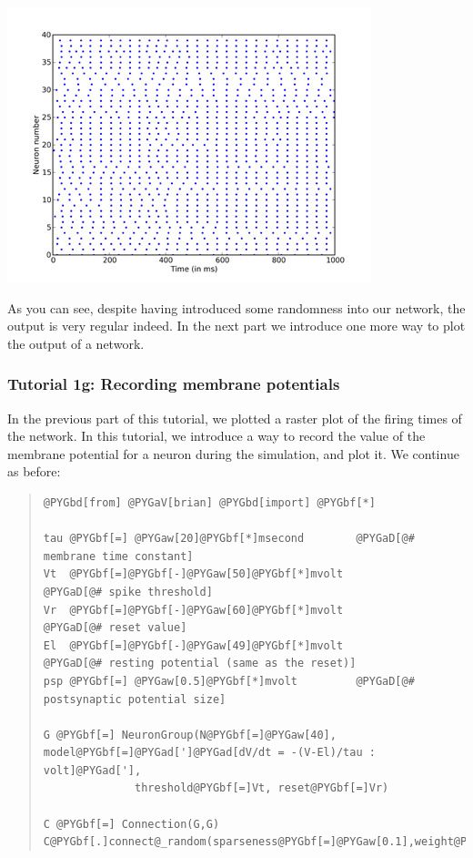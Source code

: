 \documentclass[letterpaper,10pt,english]{manual}
\begin{document}
\includegraphics{1f.jpg}

As you can see, despite having introduced some randomness into
our network, the output is very regular indeed. In the next part
we introduce one more way to plot the output of a network.

\resetcurrentobjects
\hypertarget{--doc-tutorial_1g_recording_membrane_potentials}{}

\subsubsection{Tutorial 1g: Recording membrane potentials}

In the previous part of this tutorial, we plotted a raster plot of
the firing times of the network. In this tutorial, we introduce
a way to record the value of the membrane potential for a neuron
during the simulation, and plot it. We continue as before:
\begin{quote}

\begin{Verbatim}[commandchars=@\[\]]
@PYGbd[from] @PYGaV[brian] @PYGbd[import] @PYGbf[*]

tau @PYGbf[=] @PYGaw[20]@PYGbf[*]msecond        @PYGaD[@# membrane time constant]
Vt  @PYGbf[=]@PYGbf[-]@PYGaw[50]@PYGbf[*]mvolt          @PYGaD[@# spike threshold]
Vr  @PYGbf[=]@PYGbf[-]@PYGaw[60]@PYGbf[*]mvolt          @PYGaD[@# reset value]
El  @PYGbf[=]@PYGbf[-]@PYGaw[49]@PYGbf[*]mvolt          @PYGaD[@# resting potential (same as the reset)]
psp @PYGbf[=] @PYGaw[0.5]@PYGbf[*]mvolt         @PYGaD[@# postsynaptic potential size]

G @PYGbf[=] NeuronGroup(N@PYGbf[=]@PYGaw[40], model@PYGbf[=]@PYGad[']@PYGad[dV/dt = -(V-El)/tau : volt]@PYGad['],
              threshold@PYGbf[=]Vt, reset@PYGbf[=]Vr)

C @PYGbf[=] Connection(G,G)
C@PYGbf[.]connect@_random(sparseness@PYGbf[=]@PYGaw[0.1],weight@PYGbf[=]psp)
\end{Verbatim}
\end{quote}
\end{document}
